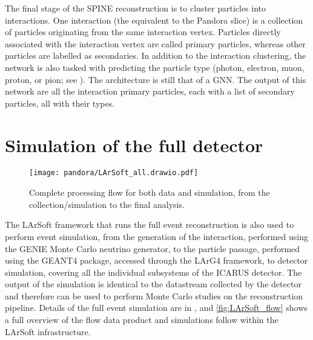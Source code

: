 The final stage of the SPINE reconstruction is to cluster particles into interactions. One interaction (the equivalent to the Pandora slice) is a collection of particles originating from the same interaction vertex. Particles directly associated with the interaction vertex are called primary particles, whereas other particles are labelled as secondaries. In addition to the interaction clustering, the network is also tasked with predicting the particle type (photon, electron, muon, proton, or pion; see \cite{DeepLearnPhysics:2020hut}). The architecture is still that of a GNN. The output of this network are all the interaction primary particles, each with a list of secondary particles, all with their types. 

\section{Simulation of the full detector}

\begin{figure}
    \centering
    \texttt{[image: pandora/LArSoft\_all.drawio.pdf]}
    \caption[LArSoft complete overview]{Complete processing flow for both data and simulation, from the collection/simulation to the final analysis. }
    \label{fig:LArSoft_flow}
\end{figure}

The LArSoft framework that runs the full event reconstruction is also used to perform event simulation, from the generation of the interaction, performed using the GENIE Monte Carlo neutrino generator, to the particle passage, performed using the GEANT4 package, accessed through the LArG4 framework, to detector simulation, covering all the individual subsystems of the ICARUS detector. The output of the simulation is identical to the datastream collected by the detector and therefore can be used to perform Monte Carlo studies on the reconstruction pipeline. Details of the full event simulation are in \cite{arteroponsStudyReconstructionNuMuCC}, and \autoref{fig:LArSoft_flow} shows a full overview of the flow data product and simulations follow within the LArSoft infrastructure.